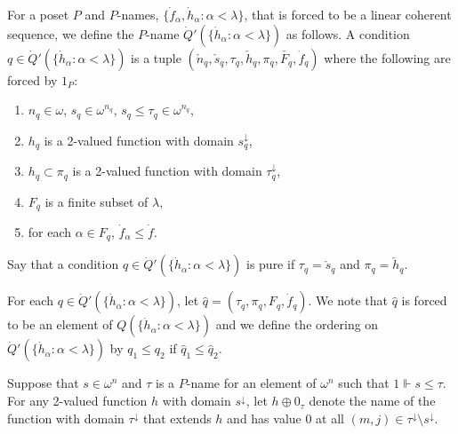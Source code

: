 \documentclass[10pt,a4paper]{amsart}
\begin{document}
\begin{definition} For a poset $P$ and   $P$-names, 
 $\{ \dot f_\alpha, \dot h_\alpha : \alpha < \lambda\}$,
 that is forced to be a linear coherent sequence, we define\label{Q'} 
 the $P$-name $\dot Q'(\{ \dot h_\alpha : \alpha < \lambda\})$ as
 follows. A condition $q\in 
 \dot Q'(\{ \dot h_\alpha : \alpha < \lambda\})$ is a tuple
  $( \check{n}_q, \check{s}_q, \tau_q, \check{h}_q, \pi_q, \check{F_q}, \dot f_q)$
  where the following are forced by $1_{P}$: 
  \begin{enumerate}
  \item  $n_q\in \omega$, $s_q   \in \omega^{n_q}$, $s_q\leq \tau_q\in \omega^{n_q}$,
  \item $h_q$ is a 2-valued function with domain $s_q^{\downarrow}$,
  \item $h_q\subset \pi_q$ is a 2-valued function with domain $\tau_q^{\downarrow}$,
  \item $F_q$ is a finite subset of $\lambda$,
  \item for each $\alpha\in F_q$, $\dot f_\alpha \leq \dot f$.
  \end{enumerate}
Say that a condition $q\in \dot Q'(\{ \dot h_\alpha : \alpha < \lambda\})$ 
is pure if $\tau_q = \check{s}_q $ and $\pi_q = \check{h}_q$.



For each $q\in \dot Q'(\{\dot h_\alpha :\alpha < \lambda\})$, 
  let $\hat q = ( \tau_q , \pi_q, F_q, \dot f_q)$.  We note that
   $\hat q$ is forced to be an element of $Q(\{ \dot h_\alpha :\alpha < \lambda\})$
   and we define the ordering on 
$    \dot Q'(\{\dot h_\alpha :\alpha < \lambda\})$ 
by $q_1 \leq q_2$ if 
  $\hat{q}_1 \leq \hat{q}_2 $.
\medskip

 Suppose that $s\in \omega^n$ and $\tau$ is a $P$-name for an
 element of $\omega^n$ such that $1\Vdash s\leq \tau$. 
 For any 2-valued function $h$ with domain $s^{\downarrow}$,
  let $h\oplus 0_{\tau}$ denote the name of the function with domain
   $\tau^{\downarrow}$ that extends $h$ and has value $0$
   at all $(m,j)\in \tau^{\downarrow}\setminus s^\downarrow$.
\end{definition}
\end{document}
